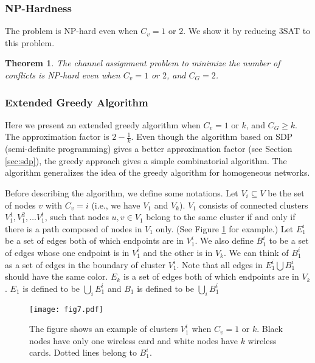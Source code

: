 \documentclass[titlepage, 11pt]{article}
\newtheorem{theorem}{Theorem}
\begin{document}
\subsubsection{NP-Hardness}
\label{sec:hetnp}
The problem is NP-hard even when $C_v = 1$ or $2$. We show it by reducing 3SAT to this problem. 
\begin{theorem}
The channel assignment problem to minimize the number of conflicts 
is NP-hard even when $C_v =1$ or $2$, and $C_G = 2$.
\label{theorem:nphard}
\end{theorem}

\subsubsection{Extended Greedy Algorithm}
\label{sec:ext}


Here we present an extended greedy algorithm when $C_v = 1$ or $k$,
and $C_G \ge k$.
The approximation factor is $2 - \frac{1}{k}$. Even though
the algorithm based on SDP (semi-definite programming) gives
a better approximation factor (see Section \ref{sec:sdp}), 
the greedy approach gives a simple combinatorial algorithm. 
The algorithm generalizes the idea of the greedy algorithm 
for homogeneous networks.

Before describing the algorithm, we define some notations. 
Let $V_i \subseteq V$ be the set of nodes $v$ with $C_v = i$
(i.e., we have $V_1$ and $V_k$).
$V_1$ consists of connected clusters $V^1_1, V^2_1, \dots V^t_1$,
such that nodes $u, v \in V_1$ belong to the same cluster
if and only if there is a path composed of nodes in $V_1$ only.
(See Figure \ref{fig:cgreedy} for example.)
Let $E^i_1$  be a set of edges both of which endpoints are in $V^i_1$.
We also define $B^i_1$ to be a set of edges whose one
endpoint is in $V^i_1$ and the other is in $V_k$. We can think of 
$B^i_1$ as a set of edges in the boundary of cluster $V_1^i$.
Note that all edges in $E^i_1 \bigcup B^i_1$ should have the same color.
$E_k$  is a set of edges both of which endpoints are in $V_k$.
$E_1$ is defined to be $\bigcup_i E^i_1$ and $B_1$ is defined to be $\bigcup_i B^i_1$

\begin{figure}[ht]      
\begin{center}        
  \begin{center}
    \centerline{\texttt{[image: fig7.pdf]}}
    \caption{The figure shows an example of clusters $V_1^i$
when $C_v = 1$ or $k$. Black nodes have only one wireless card
and white nodes have $k$ wireless cards. Dotted lines belong
to $B^i_1$.
\label{fig:cgreedy}}
  \end{center}
\end{center}
\end{figure}
\end{document}
